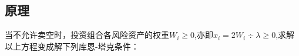 
\subsection{原理}
当不允许卖空时，投资组合各风险资产的权重$W_i\geqslant 0$,亦即$x_i=2W_i\div\lambda\geqslant0$,求解以上方程变成解下列库恩-塔克条件：
